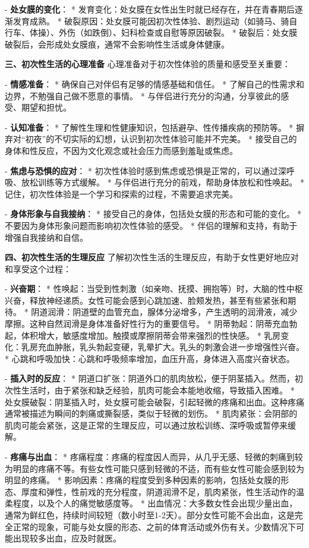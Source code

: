 \begin{enumerate}
  - \textbf{处女膜的变化}：
    * 发育变化：处女膜在女性出生时就已经存在，并在青春期后逐渐发育成熟。
    * 破裂原因：处女膜可能因初次性体验、剧烈运动（如骑马、骑自行车、体操）、外伤（如跌倒）、妇科检查或自慰等原因破裂。
    * 破裂后：处女膜破裂后，会形成处女膜痕，通常不会影响性生活或身体健康。

  \textbf{三、初次性生活的心理准备}
  心理准备对于初次性体验的质量和感受至关重要：

  - \textbf{情感准备}：
    * 确保自己对伴侣有足够的情感基础和信任。
    * 了解自己的性需求和边界，不勉强自己做不愿意的事情。
    * 与伴侣进行充分的沟通，分享彼此的感受、期望和担忧。

  - \textbf{认知准备}：
    * 了解性生理和性健康知识，包括避孕、性传播疾病的预防等。
    * 摒弃对“初夜”的不切实际的幻想，认识到初次性体验可能并不完美。
    * 接受自己的身体和性反应，不因为文化观念或社会压力而感到羞耻或焦虑。

  - \textbf{焦虑与恐惧的应对}：
    * 初次性体验时感到焦虑或恐惧是正常的，可以通过深呼吸、放松训练等方式缓解。
    * 与伴侣进行充分的前戏，帮助身体放松和性唤起。
    * 记住，初次性体验是一个学习和探索的过程，不需要追求完美。

  - \textbf{身体形象与自我接纳}：
    * 接受自己的身体，包括处女膜的形态和可能的变化。
    * 不要因为身体形象问题而影响初次性体验的感受。
    * 伴侣的理解和支持，有助于增强自我接纳和自信。

  \textbf{四、初次性生活的生理反应}
  了解初次性生活的生理反应，有助于女性更好地应对和享受这个过程：

  - \textbf{兴奋期}：
    * 性唤起：当受到性刺激（如亲吻、抚摸、拥抱等）时，大脑的性中枢兴奋，释放神经递质。女性可能会感到心跳加速、脸颊发热，甚至有些紧张和期待。
    * 阴道润滑：阴道壁的血管充血，腺体分泌增多，产生透明的润滑液，减少摩擦。这种自然润滑是身体准备好性行为的重要信号。
    * 阴蒂勃起：阴蒂充血勃起，体积增大，敏感度增加。触摸或摩擦阴蒂会带来强烈的性快感。
    * 乳房变化：乳房充血肿胀，乳头勃起变硬，乳晕扩大。乳头的刺激会进一步增强性兴奋。
    * 心跳和呼吸加快：心跳和呼吸频率增加，血压升高，身体进入高度兴奋状态。

  - \textbf{插入时的反应}：
    * 阴道口扩张：阴道外口的肌肉放松，便于阴茎插入。然而，初次性生活时，由于紧张和缺乏经验，肌肉可能会本能地收缩，导致插入困难。
    * 处女膜破裂：阴茎插入时，处女膜可能会破裂，引起轻微的疼痛和出血。这种疼痛通常被描述为瞬间的刺痛或撕裂感，类似于轻微的划伤。
    * 肌肉紧张：会阴部的肌肉可能会紧张，这是正常的生理反应，可以通过放松训练、深呼吸或暂停来缓解。

  - \textbf{疼痛与出血}：
    * 疼痛程度：疼痛的程度因人而异，从几乎无感、轻微的刺痛到较为明显的疼痛不等。有些女性可能只感到轻微的不适，而有些女性可能会感到较为明显的疼痛。
    * 影响因素：疼痛的程度受到多种因素的影响，包括处女膜的形态、厚度和弹性，性前戏的充分程度，阴道润滑不足，肌肉紧张，性生活动作的温柔程度，以及个人的痛觉敏感度等。
    * 出血情况：大多数女性会出现少量出血，通常为鲜红色，持续时间较短（数小时至1-2天）。部分女性可能不会出血，这是完全正常的现象，可能与处女膜的形态、之前的体育活动或外伤有关。少数情况下可能出现较多出血，应及时就医。


\end{enumerate}
